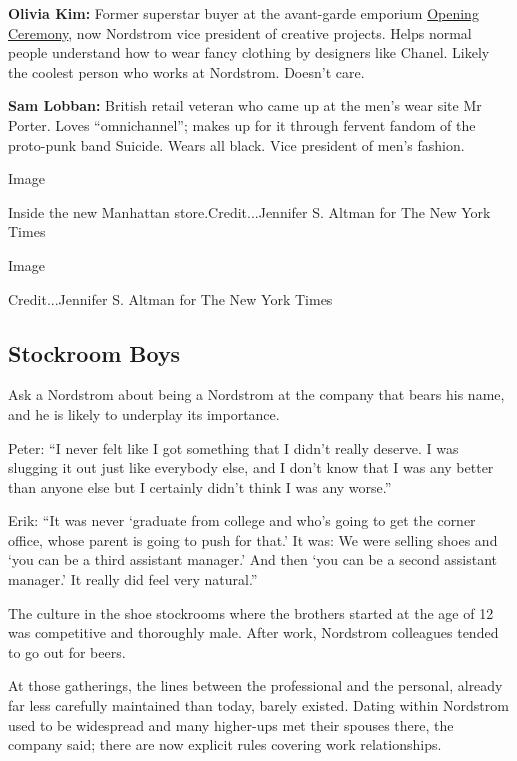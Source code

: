 \textbf{Olivia Kim:} Former superstar buyer at the avant-garde emporium
\href{https://www.newyorker.com/magazine/2017/03/20/the-cool-kids-behind-opening-ceremony}{Opening
Ceremony}, now Nordstrom vice president of creative projects. Helps
normal people understand how to wear fancy clothing by designers like
Chanel. Likely the coolest person who works at Nordstrom. Doesn't care.

\textbf{Sam Lobban:} British retail veteran who came up at the men's
wear site Mr Porter. Loves ``omnichannel''; makes up for it through
fervent fandom of the proto-punk band Suicide. Wears all black. Vice
president of men's fashion.

Image

Inside the new Manhattan store.Credit...Jennifer S. Altman for The New
York Times

Image

Credit...Jennifer S. Altman for The New York Times

\hypertarget{stockroom-boys}{%
\subsection{Stockroom Boys}\label{stockroom-boys}}

Ask a Nordstrom about being a Nordstrom at the company that bears his
name, and he is likely to underplay its importance.

Peter: ``I never felt like I got something that I didn't really deserve.
I was slugging it out just like everybody else, and I don't know that I
was any better than anyone else but I certainly didn't think I was any
worse.''

Erik: ``It was never `graduate from college and who's going to get the
corner office, whose parent is going to push for that.' It was: We were
selling shoes and `you can be a third assistant manager.' And then `you
can be a second assistant manager.' It really did feel very natural.''

The culture in the shoe stockrooms where the brothers started at the age
of 12 was competitive and thoroughly male. After work, Nordstrom
colleagues tended to go out for beers.

At those gatherings, the lines between the professional and the
personal, already far less carefully maintained than today, barely
existed. Dating within Nordstrom used to be widespread and many
higher-ups met their spouses there, the company said; there are now
explicit rules covering work relationships.

